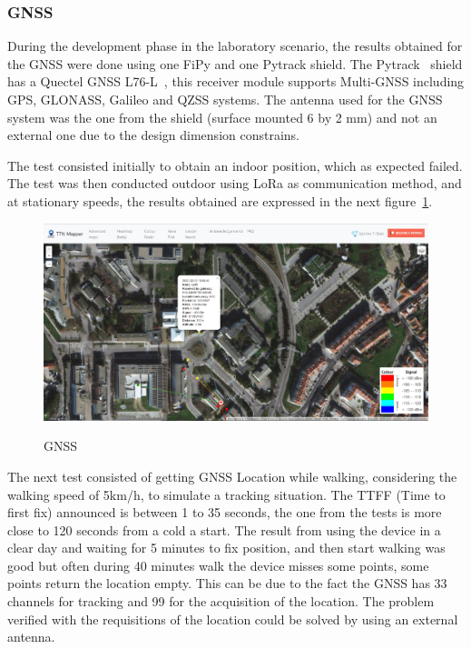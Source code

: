\newpage
\subsubsection{GNSS}
\label{subsubsec:Geo_GNSS}
During the development phase in the laboratory scenario, the results obtained for the GNSS were done using one FiPy and one Pytrack shield. The Pytrack~\cite{PytrackSpecs} shield has a Quectel GNSS L76-L~\cite{quectel,quectelspecs}, this receiver module supports Multi-GNSS including GPS, GLONASS, Galileo and QZSS systems. The antenna used for the GNSS system was the one from the shield (surface mounted 6 by 2 mm) and not an external one due to the design dimension constrains.

The test consisted initially to obtain an indoor position, which as expected failed. The test was then conducted outdoor using LoRa as communication method, and at stationary speeds, the results obtained are expressed in the next figure~\ref{fig:GNSS_points}.

\begin{figure}[htbp]
  \centering

    {\includegraphics[width=0.7\linewidth]{Chapters/Figures/ttnmappergps.JPG}}%

  \caption{GNSS }
  \label{fig:GNSS_points}
\end{figure}

The next test consisted of getting  GNSS Location while walking, considering the walking speed of 5km/h, to simulate a tracking situation. The TTFF (Time to first fix) announced is between 1 to 35 seconds, the one from the tests is more close to 120 seconds from a cold a start. The result from using the device in a clear day and waiting for 5 minutes to fix position, and then start walking was good but often during 40 minutes walk the device misses some points, some points return the location empty. This can be due to the fact the GNSS has 33 channels for tracking and 99 for the acquisition of the location. The problem verified with the requisitions of the location could be solved by using an external antenna.

